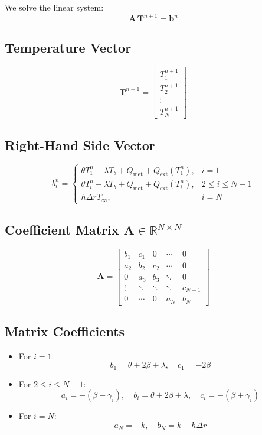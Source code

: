 \documentclass[12pt]{article}
\begin{document}
We solve the linear system:
\[
\mathbf{A} \, \mathbf{T}^{n+1} = \mathbf{b}^n
\]

\subsection*{Temperature Vector}

\[
\mathbf{T}^{n+1} =
\begin{bmatrix}
T_1^{n+1} \\
T_2^{n+1} \\
\vdots \\
T_{N}^{n+1}
\end{bmatrix}
\]

\subsection*{Right-Hand Side Vector}

\[
b_i^n =
\begin{cases}
\theta T_1^n + \lambda T_b + Q_{\text{met}} + Q_{\text{ext}}(T_1^n), & i = 1 \\
\theta T_i^n + \lambda T_b + Q_{\text{met}} + Q_{\text{ext}}(T_i^n), & 2 \leq i \leq N-1 \\
h \Delta r T_\infty, & i = N
\end{cases}
\]

\subsection*{Coefficient Matrix \( \mathbf{A} \in \mathbb{R}^{N \times N} \)}

\[
\mathbf{A} =
\begin{bmatrix}
b_1 & c_1 & 0 & \cdots & 0 \\
a_2 & b_2 & c_2 & \cdots & 0 \\
0 & a_3 & b_3 & \ddots & 0 \\
\vdots & \ddots & \ddots & \ddots & c_{N-1} \\
0 & \cdots & 0 & a_N & b_N
\end{bmatrix}
\]

\subsection*{Matrix Coefficients}

\begin{itemize}
    \item For \( i = 1 \): 
    \[
    b_1 = \theta + 2\beta + \lambda, \quad c_1 = -2\beta
    \]
    \item For \( 2 \leq i \leq N-1 \): 
    \[
    a_i = -(\beta - \gamma_i), \quad
    b_i = \theta + 2\beta + \lambda, \quad
    c_i = -(\beta + \gamma_i)
    \]
    \item For \( i = N \): 
    \[
    a_N = -k, \quad b_N = k + h \Delta r
    \]
\end{itemize}
\end{document}
